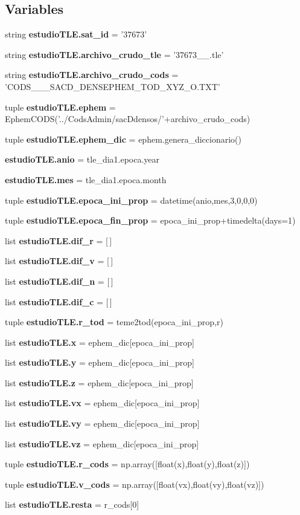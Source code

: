 \subsection*{\-Variables}
\begin{DoxyCompactItemize}
\item 
string {\bf estudio\-T\-L\-E.\-sat\-\_\-id} = '37673'
\item 
string {\bf estudio\-T\-L\-E.\-archivo\-\_\-crudo\-\_\-tle} = '37673\-\_\-\_.\-tle'
\item 
string {\bf estudio\-T\-L\-E.\-archivo\-\_\-crudo\-\_\-cods} = '\-C\-O\-D\-S\-\_\-\_\-\_\-\-S\-A\-C\-D\-\_\-\-D\-E\-N\-S\-E\-P\-H\-E\-M\-\_\-\-T\-O\-D\-\_\-\-X\-Y\-Z\-\_\-\-O.\-T\-X\-T'
\item 
tuple {\bf estudio\-T\-L\-E.\-ephem} = \-Ephem\-C\-O\-D\-S('../\-Cods\-Admin/sac\-Ddensos/'+archivo\-\_\-crudo\-\_\-cods)
\item 
tuple {\bf estudio\-T\-L\-E.\-ephem\-\_\-dic} = ephem.\-genera\-\_\-diccionario()
\item 
{\bf estudio\-T\-L\-E.\-anio} = tle\-\_\-dia1.\-epoca.\-year
\item 
{\bf estudio\-T\-L\-E.\-mes} = tle\-\_\-dia1.\-epoca.\-month
\item 
tuple {\bf estudio\-T\-L\-E.\-epoca\-\_\-ini\-\_\-prop} = datetime(anio,mes,3,0,0,0)
\item 
tuple {\bf estudio\-T\-L\-E.\-epoca\-\_\-fin\-\_\-prop} = epoca\-\_\-ini\-\_\-prop+timedelta(days=1)
\item 
list {\bf estudio\-T\-L\-E.\-dif\-\_\-r} = [$\,$]
\item 
list {\bf estudio\-T\-L\-E.\-dif\-\_\-v} = [$\,$]
\item 
list {\bf estudio\-T\-L\-E.\-dif\-\_\-n} = [$\,$]
\item 
list {\bf estudio\-T\-L\-E.\-dif\-\_\-c} = [$\,$]
\item 
tuple {\bf estudio\-T\-L\-E.\-r\-\_\-tod} = teme2tod(epoca\-\_\-ini\-\_\-prop,r)
\item 
list {\bf estudio\-T\-L\-E.\-x} = ephem\-\_\-dic[epoca\-\_\-ini\-\_\-prop]
\item 
list {\bf estudio\-T\-L\-E.\-y} = ephem\-\_\-dic[epoca\-\_\-ini\-\_\-prop]
\item 
list {\bf estudio\-T\-L\-E.\-z} = ephem\-\_\-dic[epoca\-\_\-ini\-\_\-prop]
\item 
list {\bf estudio\-T\-L\-E.\-vx} = ephem\-\_\-dic[epoca\-\_\-ini\-\_\-prop]
\item 
list {\bf estudio\-T\-L\-E.\-vy} = ephem\-\_\-dic[epoca\-\_\-ini\-\_\-prop]
\item 
list {\bf estudio\-T\-L\-E.\-vz} = ephem\-\_\-dic[epoca\-\_\-ini\-\_\-prop]
\item 
tuple {\bf estudio\-T\-L\-E.\-r\-\_\-cods} = np.\-array([float(x),float(y),float(z)])
\item 
tuple {\bf estudio\-T\-L\-E.\-v\-\_\-cods} = np.\-array([float(vx),float(vy),float(vz)])
\item 
list {\bf estudio\-T\-L\-E.\-resta} = r\-\_\-cods[0]
\end{DoxyCompactItemize}
